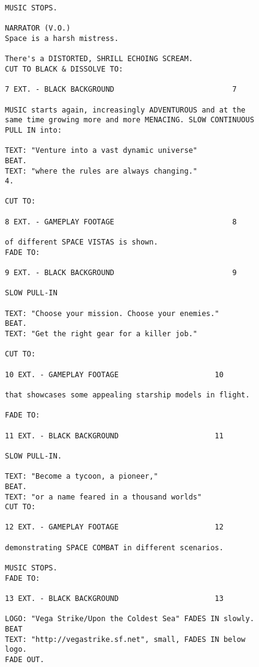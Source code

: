 \begin{verbatim}
MUSIC STOPS.

NARRATOR (V.O.)
Space is a harsh mistress.

There's a DISTORTED, SHRILL ECHOING SCREAM.
CUT TO BLACK & DISSOLVE TO:

7 EXT. - BLACK BACKGROUND 							7

MUSIC starts again, increasingly ADVENTUROUS and at the
same time growing more and more MENACING. SLOW CONTINUOUS
PULL IN into:

TEXT: "Venture into a vast dynamic universe"
BEAT.
TEXT: "where the rules are always changing."
4.

CUT TO:

8 EXT. - GAMEPLAY FOOTAGE 							8

of different SPACE VISTAS is shown.
FADE TO:

9 EXT. - BLACK BACKGROUND 							9

SLOW PULL-IN

TEXT: "Choose your mission. Choose your enemies."
BEAT.
TEXT: "Get the right gear for a killer job."

CUT TO:

10 EXT. - GAMEPLAY FOOTAGE 						10

that showcases some appealing starship models in flight.

FADE TO:

11 EXT. - BLACK BACKGROUND 						11

SLOW PULL-IN.

TEXT: "Become a tycoon, a pioneer,"
BEAT.
TEXT: "or a name feared in a thousand worlds"
CUT TO:

12 EXT. - GAMEPLAY FOOTAGE 						12

demonstrating SPACE COMBAT in different scenarios.

MUSIC STOPS.
FADE TO:

13 EXT. - BLACK BACKGROUND 						13

LOGO: "Vega Strike/Upon the Coldest Sea" FADES IN slowly.
BEAT
TEXT: "http://vegastrike.sf.net", small, FADES IN below
logo.
FADE OUT.
\end{verbatim}
